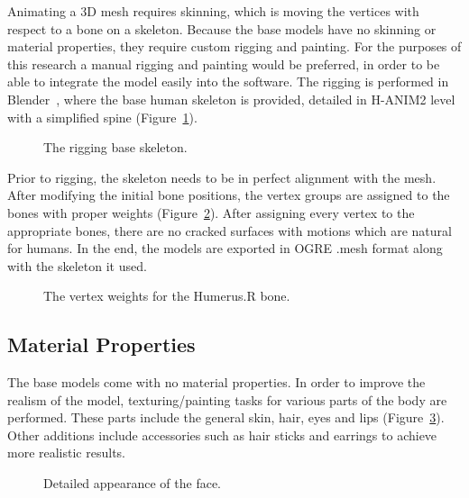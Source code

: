 Animating a 3D mesh requires skinning, which is moving the vertices with respect to a bone on a skeleton. Because the base models have no skinning or material properties, they require custom rigging and painting. For the purposes of this research a manual rigging and painting would be preferred, in order to be able to integrate the model easily into the software. The rigging is performed in Blender~\cite{Blender}, where the base human skeleton is provided, detailed in H-ANIM2 level with a simplified spine (Figure~\ref{fig:rigging_skeleton}). 

\begin{figure}[ht]
\centerline{}
\caption{The rigging base skeleton.}
\label{fig:rigging_skeleton}
\end{figure}

Prior to rigging, the skeleton needs to be in perfect alignment with the mesh. After modifying the initial bone positions, the vertex groups are assigned to the bones with proper weights (Figure~\ref{fig:weight_humerus_r}).
After assigning every vertex to the appropriate bones, there are no cracked surfaces with motions which are natural for humans. In the end, the models are exported in OGRE .mesh format along with the skeleton it used.

\begin{figure}[ht]
\centerline{}
\caption{The vertex weights for the Humerus.R bone.}
\label{fig:weight_humerus_r}
\end{figure}

\subsection{Material Properties}

The base models come with no material properties. In order to improve the realism of the model, texturing/painting tasks for various parts of the body are performed. These parts include the general skin, hair, eyes and lips (Figure~\ref{fig:detailed_face}). Other additions include accessories such as hair sticks and earrings to achieve more realistic results.

\begin{figure}[ht]
\centerline{}
\caption{Detailed appearance of the face.}
\label{fig:detailed_face}
\end{figure}

